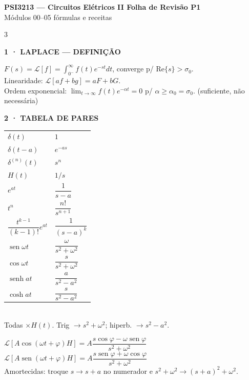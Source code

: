 \documentclass[10pt,a4paper]{article}
\renewcommand{\arraystretch}{1.05}
\newcommand{\sect}[1]{\vspace{1.2mm}{\color{acc}\rule{\linewidth}{0.9pt}}\vspace{-0.3mm}\par
  {\footnotesize\bfseries\color{acc}\MakeUppercase{#1}}\par\vspace{0.6mm}}
\newcommand{\sub}[1]{\vspace{0.8mm}{\bfseries #1}\par\vspace{0.3mm}}
\newcommand{\ci}{0^{-}}
\begin{document}
\footnotesize

\begin{center}
{\normalsize\bfseries PSI3213 — Circuitos Elétricos II \;\textbullet\; Folha de Revisão P1}\\[0.3mm]
{\color{gry}\scriptsize Módulos 00–05 \;\textbullet\; fórmulas e receitas}
\end{center}
\vspace{-1mm}

\begin{multicols}{3}

\sect{1 · Laplace — definição}
$\displaystyle F(s)=\mathcal{L}[f]=\int_{\ci}^{\infty}\! f(t)e^{-st}dt$,\; converge p/ $\mathrm{Re}\{s\}>\sigma_0$.\\
Linearidade: $\mathcal{L}[af+bg]=aF+bG$.\\
Ordem exponencial: $\lim_{t\to\infty}f(t)e^{-\alpha t}=0$ p/ $\alpha\ge\alpha_0=\sigma_0$. (suficiente, não necessária)

\sect{2 · Tabela de pares}
{\renewcommand{\arraystretch}{1.45}
\begin{tabular}{@{}l@{\;\;}l@{}}
$\delta(t)$ & $1$\\
$\delta(t-a)$ & $e^{-as}$\\
$\delta^{(n)}(t)$ & $s^n$\\
$H(t)$ & $1/s$\\
$e^{at}$ & $\dfrac{1}{s-a}$\\
$t^n$ & $\dfrac{n!}{s^{n+1}}$\\
$\dfrac{t^{k-1}}{(k-1)!}e^{at}$ & $\dfrac{1}{(s-a)^{k}}$\\
$\operatorname{sen}\omega t$ & $\dfrac{\omega}{s^2+\omega^2}$\\
$\cos\omega t$ & $\dfrac{s}{s^2+\omega^2}$\\
$\operatorname{senh}at$ & $\dfrac{a}{s^2-a^2}$\\
$\cosh at$ & $\dfrac{s}{s^2-a^2}$\\
\end{tabular}}\\[1mm]
{\color{gry}Todas $\times H(t)$. Trig $\to s^2{+}\omega^2$; hiperb. $\to s^2{-}a^2$.}

\sub{Senoides com fase}
$\mathcal{L}[A\cos(\omega t{+}\varphi)H]=A\dfrac{s\cos\varphi-\omega\operatorname{sen}\varphi}{s^2+\omega^2}$\\[0.8mm]
$\mathcal{L}[A\operatorname{sen}(\omega t{+}\varphi)H]=A\dfrac{s\operatorname{sen}\varphi+\omega\cos\varphi}{s^2+\omega^2}$\\[0.8mm]
Amortecidas: troque $s\to s{+}a$ no numerador e $s^2{+}\omega^2\to(s{+}a)^2{+}\omega^2$.


\end{multicols}
\end{document}
